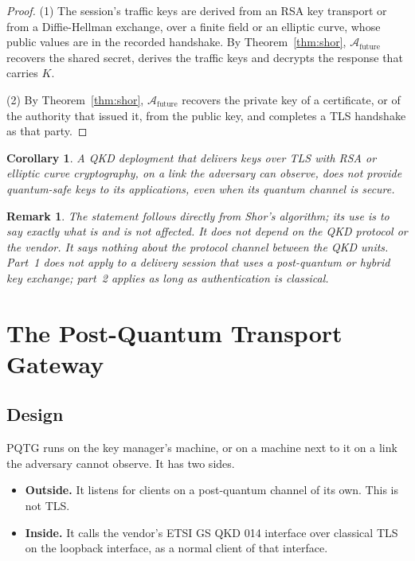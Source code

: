 \documentclass[11pt,letterpaper]{article}
\newtheorem{corollary}[theorem]{Corollary}
\newtheorem{remark}{Remark}
\begin{document}
\begin{proof}
(1) The session's traffic keys are derived from an RSA key transport or from a Diffie-Hellman exchange, over a finite field or an elliptic curve, whose public values are in the recorded handshake. By Theorem~\ref{thm:shor}, $\mathcal{A}_{\text{future}}$ recovers the shared secret, derives the traffic keys and decrypts the response that carries $K$.

(2) By Theorem~\ref{thm:shor}, $\mathcal{A}_{\text{future}}$ recovers the private key of a certificate, or of the authority that issued it, from the public key, and completes a TLS handshake as that party.
\end{proof}

\begin{corollary}
\label{cor:main}
A QKD deployment that delivers keys over TLS with RSA or elliptic curve cryptography, on a link the adversary can observe, does not provide quantum-safe keys to its applications, even when its quantum channel is secure.
\end{corollary}

\begin{remark}
The statement follows directly from Shor's algorithm; its use is to say exactly what is and is not affected. It does not depend on the QKD protocol or the vendor. It says nothing about the protocol channel between the QKD units. Part~1 does not apply to a delivery session that uses a post-quantum or hybrid key exchange; part~2 applies as long as authentication is classical.
\end{remark}

\section{The Post-Quantum Transport Gateway}

\subsection{Design}

PQTG runs on the key manager's machine, or on a machine next to it on a link the adversary cannot observe. It has two sides.

\begin{itemize}
    \item \textbf{Outside.} It listens for clients on a post-quantum channel of its own. This is not TLS.
    \item \textbf{Inside.} It calls the vendor's ETSI GS QKD 014 interface over classical TLS on the loopback interface, as a normal client of that interface.
\end{itemize}
\end{document}
